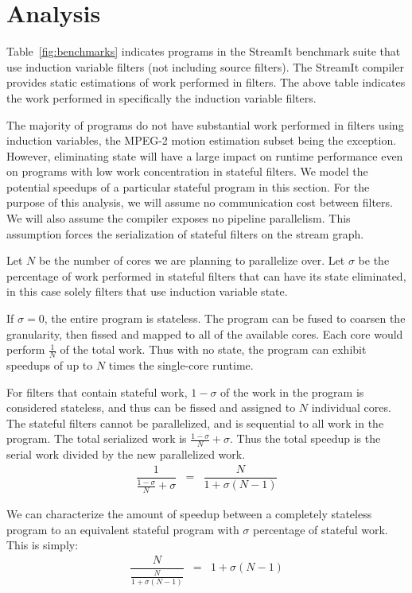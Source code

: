\section{Analysis}
\label{sec:analysis}

Table~\ref{fig:benchmarks} indicates programs in the StreamIt benchmark suite that use induction variable filters (not including source filters).  The StreamIt compiler provides static estimations of work performed in filters.  The above table indicates the work performed in specifically the induction variable filters.

The majority of programs do not have substantial work performed in filters using induction variables, the MPEG-2 motion estimation subset being the exception.  However, eliminating state will have a large impact on runtime performance even on programs with low work concentration in stateful filters.  We model the potential speedups of a particular stateful program in this section.  For the purpose of this analysis, we will assume no communication cost between filters.  We will also assume the compiler exposes no pipeline parallelism.  This assumption forces the serialization of stateful filters on the stream graph.

Let $N$ be the number of cores we are planning to parallelize over.  Let $\sigma$ be the percentage of work performed in stateful filters that can have its state eliminated, in this case solely filters that use induction variable state.  

If $\sigma = 0$, the entire program is stateless.  The program can be fused to coarsen the granularity, then fissed and mapped to all of the available cores.  Each core would perform $\frac{1}{N}$ of the total work.  Thus with no state, the program can exhibit speedups of up to $N$ times the single-core runtime.

For filters that contain stateful work, $1-\sigma$ of the work in the program is considered stateless, and thus can be fissed and assigned to $N$ individual cores.  The stateful filters cannot be parallelized, and is sequential to all work in the program.  The total serialized work is $\frac{1-\sigma}{N} + \sigma$.  Thus the total speedup is the serial work divided by the new parallelized work.  
\begin{eqnarray*}
\dfrac{1}{\frac{1-\sigma}{N} + \sigma} &=& \dfrac{N}{1 + \sigma(N-1)}
\end{eqnarray*}

We can characterize the amount of speedup between a completely stateless program to an equivalent stateful program with $\sigma$ percentage of stateful work.  This is simply:
\begin{eqnarray*}
\dfrac{N}{\frac{N}{1 + \sigma(N-1)}} &=& 1 + \sigma(N-1)
\end{eqnarray*}

